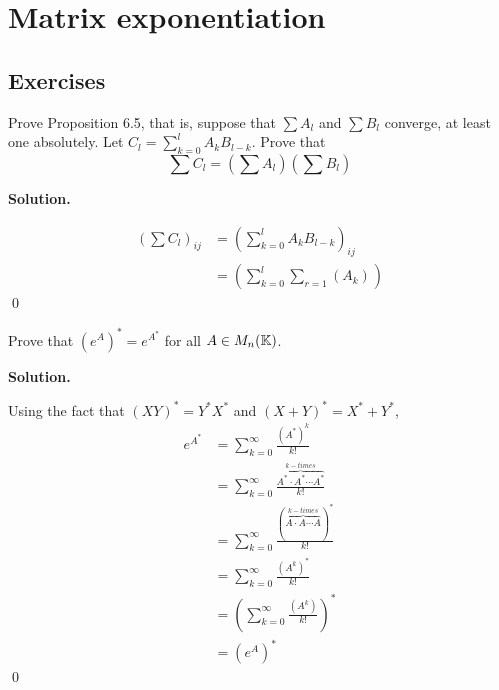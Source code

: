 \documentclass[12pt]{book}
\theoremstyle{definition}
\newenvironment{solution}
{%
  \par\noindent\textbf{Solution.}\quad
}
{%
  \qed\par
}
\begin{document}
\begin{taggedexercise}[\textcolor{red}{TODO}]

\end{taggedexercise}

\begin{taggedexercise}[\textcolor{red}{TODO}]

\end{taggedexercise}

\chapter{Matrix exponentiation}
\section{Exercises}

\begin{taggedexercise}[\textcolor{yellow}{WIP}]
Prove Proposition 6.5, that is, suppose that $\sum A_l$ and $\sum B_l$ converge, at least one absolutely.
Let $C_l = \sum_{k=0}^l A_kB_{l-k}$. Prove that
\[
\sum C_l = (\sum A_l)(\sum B_l)
\]
\end{taggedexercise}

\begin{solution}
\[
\begin{aligned}
  (\sum C_l)_{ij} &= (\sum_{k=0}^l A_kB_{l-k})_{ij} \\
                  &= (\sum_{k=0}^l \sum_{r=1}(A_k)_{})
\end{aligned}
\]
\end{solution}

\begin{taggedexercise}[\textcolor{green}{Complete}]
  Prove that $(e^A)^* = e^{A^*}$ for all $A \in M_n(\mathbb{K})$.
\end{taggedexercise}

\begin{solution}
  Using the fact that $(XY)^* = Y^*X^*$ and $(X + Y)^* = X^* + Y^*$,
  \[
  \begin{aligned}
    e^{A^*} &= \sum_{k = 0}^\infty \frac{(A^*)^k}{k!} \\
            &= \sum_{k = 0}^\infty \frac{\overbrace{A^* \cdot A^* \cdots A^*}^{k-times}}{k!} \\
            &= \sum_{k = 0}^\infty \frac{(\overbrace{A \cdot A \cdots A}^{k-times})^*}{k!} \\
            &= \sum_{k = 0}^\infty \frac{(A^k)^*}{k!} \\
            &= \left(\sum_{k = 0}^\infty \frac{(A^k)}{k!}\right)^* \\
            &= (e^A)^*
  \end{aligned}
  \]
\end{solution}
\end{document}
